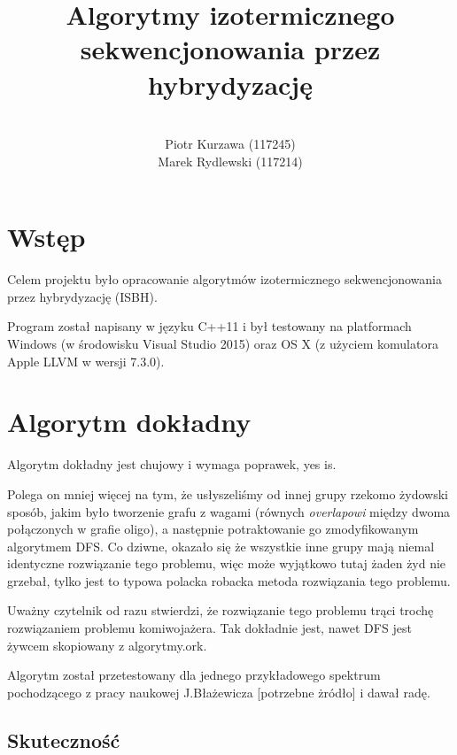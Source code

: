 \documentclass{article}
\title{Algorytmy izotermicznego sekwencjonowania przez hybrydyzację}
\author{ \\ Piotr Kurzawa (117245) \\ Marek Rydlewski (117214)}
\begin{document}
\maketitle

\vspace{3ex}

\tableofcontents

\newpage

\section{Wstęp}

Celem projektu było opracowanie algorytmów izotermicznego sekwencjonowania przez hybrydyzację (ISBH). 



Program został napisany w języku C++11 i był testowany na platformach Windows (w środowisku Visual Studio 2015) oraz OS X (z użyciem komulatora Apple LLVM w wersji 7.3.0). 

\section{Algorytm dokładny}

Algorytm dokładny jest chujowy i wymaga poprawek, yes is. 

Polega on mniej więcej na tym, że usłyszeliśmy od innej grupy rzekomo żydowski sposób, jakim było tworzenie grafu z wagami (równych \textit{overlapowi} między dwoma połączonych w grafie oligo), a następnie potraktowanie go zmodyfikowanym algorytmem DFS. Co dziwne, okazało się że wszystkie inne grupy mają niemal identyczne rozwiązanie tego problemu, więc może wyjątkowo tutaj żaden żyd nie grzebał, tylko jest to typowa polacka robacka metoda rozwiązania tego problemu.

Uważny czytelnik od razu stwierdzi, że rozwiązanie tego problemu trąci trochę rozwiązaniem problemu komiwojażera. Tak dokładnie jest, nawet DFS jest żywcem skopiowany z algorytmy.ork.

Algorytm został przetestowany dla jednego przykładowego spektrum pochodzącego z pracy naukowej J.Błażewicza [potrzebne żródło] i dawał radę.

\subsection{Skuteczność}
\end{document}
